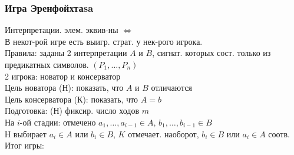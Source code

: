 \subsubsection{Игра Эренфойхтаsa}
\begin{theorem}
Интерпретации. элем. эквив-ны $\iff$ \\

В некот-рой игре есть выигр. страт. у нек-рого игрока. \\

Правила: заданы 2 интерпретации $A$ и $B$, сигнат. которых сост. только из предикатных символов. $(P_1, \ldots, P_n)$ \\

2 игрока: новатор и консерватор \\

Цель новатора (Н): показать, что $A$ и $B$ отличаются \\

Цель консерватора (К): показать, что $A = b$ \\

Подготовка: (Н) фиксир. число ходов $m$ \\

На $i$-ой стадии: отмечено $a_1, \ldots, a_{i - 1} \in A$, $b_1, \ldots, b_{i - 1} \in B$ \\

Н выбирает  $a_i \in A$ или $b_i \in B$, $K$ отмечает. наоборот, $b_i \in B$ или $a_i \in A$ соотв. \\

Итог игры: \\


\end{theorem}
